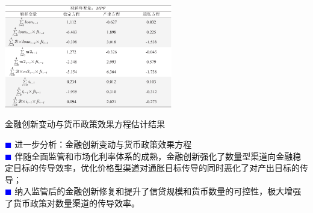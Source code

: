 \documentclass[12pt,aspectratio=169]{ctexbeamer}
\begin{document}
			\begin{frame}
				\frametitle{}
				\begin{table}
					\centering
					\vspace{-10mm}
					\includegraphics[width=0.55\textwidth]{figures/tab.6-4}
					\caption{金融创新变动与货币政策效果方程估计结果}
					\label{tab.6-4}
				\end{table}	
					\justifying
					\hspace{1em}
					\textcolor{blue}{\footnotesize $\blacksquare$} {\large 进一步分析：金融创新变动与货币政策效果方程}\\
					\vspace{2mm}
					\footnotesize
					\hspace{2em}
					\textcolor{blue}{\tiny $\blacksquare$} 伴随全面监管和市场化利率体系的成熟，金融创新强化了数量型渠道向金融稳定目标的传导效率，优化价格型渠道对通胀目标传导的同时恶化了对产出目标的传导；\\
					\hspace{2em}
					\textcolor{blue}{\tiny $\blacksquare$} 纳入监管后的金融创新修复和提升了信贷规模和货币数量的可控性，极大增强了货币政策对数量渠道的传导效率。
				\end{frame}
\end{document}
